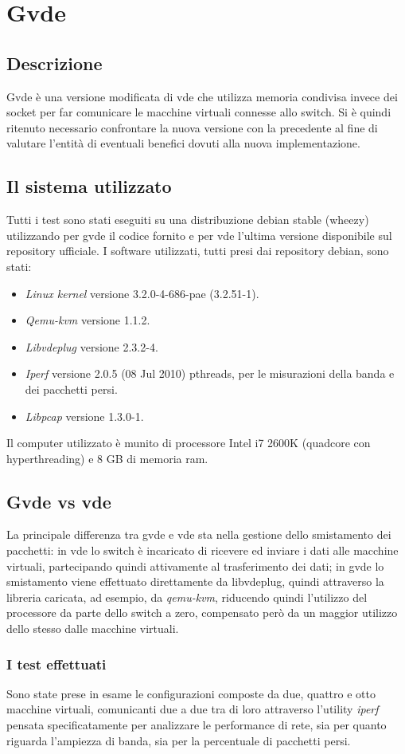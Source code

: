 \chapter{Gvde}
\section{Descrizione}
Gvde è una versione modificata di vde che utilizza memoria condivisa invece dei socket per far comunicare le macchine virtuali connesse allo switch. Si è quindi ritenuto necessario confrontare la nuova versione con la precedente al fine di valutare l'entità di eventuali benefici dovuti alla nuova implementazione.
\section{Il sistema utilizzato}
Tutti i test sono stati eseguiti su una distribuzione debian stable (wheezy) utilizzando per gvde il codice fornito e per vde l'ultima versione disponibile sul repository ufficiale. I software utilizzati, tutti presi dai repository debian, sono stati:
\begin{itemize}
\item {\em Linux kernel} versione 3.2.0-4-686-pae (3.2.51-1).
\item {\em Qemu-kvm} versione 1.1.2.
\item {\em Libvdeplug} versione 2.3.2-4.
\item {\em Iperf} versione 2.0.5 (08 Jul 2010) pthreads, per le misurazioni della banda e dei pacchetti persi.
\item {\em Libpcap} versione 1.3.0-1.
\end{itemize}
Il computer utilizzato è munito di processore Intel i7 2600K (quadcore con hyperthreading) e 8 GB di memoria ram.
\section{Gvde vs vde}
La principale differenza tra gvde e vde sta nella gestione dello smistamento dei pacchetti: in vde lo switch è incaricato di ricevere ed inviare i dati alle macchine virtuali, partecipando quindi attivamente al trasferimento dei dati; in gvde lo smistamento viene effettuato direttamente da libvdeplug, quindi attraverso la libreria caricata, ad esempio, da {\em qemu-kvm}, riducendo quindi l'utilizzo del processore da parte dello switch a zero, compensato però da un maggior utilizzo dello stesso dalle macchine virtuali.
\subsection{I test effettuati}
Sono state prese in esame le configurazioni composte da due, quattro e otto macchine virtuali, comunicanti due a due tra di loro attraverso l'utility {\em iperf} pensata specificatamente per analizzare le performance di rete, sia per quanto riguarda l'ampiezza di banda, sia per la percentuale di pacchetti persi.
